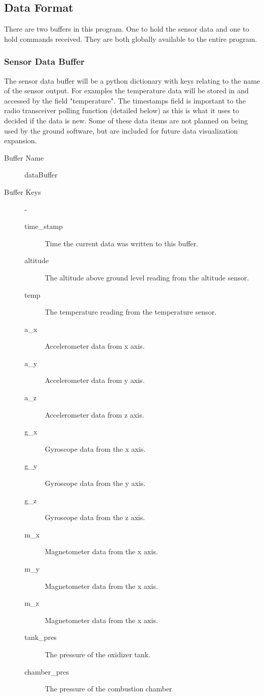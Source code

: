 \documentclass[10pt,draftclsnofoot,onecolumn,compsoc]{IEEEtran}
\begin{document}
\subsection{Data Format}
There are two buffers in this program. One to hold the sensor data and one to hold commands received. They are both globally available to the entire program.
\subsubsection{Sensor Data Buffer}
The sensor data buffer will be a python dictionary with keys relating to the name of the sensor output. For examples the temperature data will be stored in and accessed by the field "temperature".  The timestamps field is important to the radio transceiver polling function (detailed below) as this is what it uses to decided if the data is new. Some of these data items are not planned on being used by the ground software, but are included for future data visualization expansion.
\begin{description}
	\item[Buffer Name] dataBuffer
	\item[Buffer Keys]  -
		\begin{description}
			\item[time\_stamp] Time the current data was written to this buffer.
			\item[altitude] The altitude above ground level reading from the altitude sensor.
			\item[temp] The temperature reading from the temperature sensor.
			\item[a\_x] Accelerometer data from x axis.
			\item[a\_y] Accelerometer data from y axis.
			\item[a\_z] Accelerometer data from z axis.
			\item[g\_x] Gyroscope data from the x axis.
			\item[g\_y] Gyroscope data from the y axis.
			\item[g\_z] Gyroscope data from the z axis.
			\item[m\_x] Magnetometer data from the x axis.
			\item[m\_y] Magnetometer data from the x axis.
			\item[m\_z] Magnetometer data from the x axis.
			\item[tank\_pres] The pressure of the oxidizer tank.
			\item[chamber\_pres] The pressure of the combustion chamber
		\end{description}
\end{description}
\end{document}
